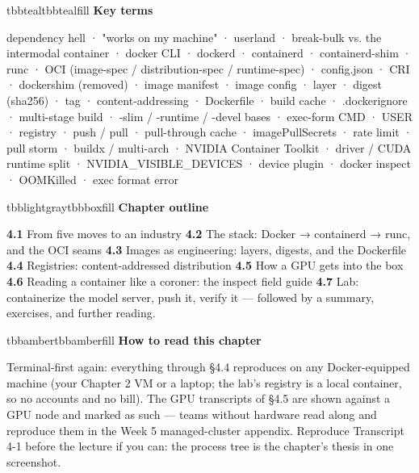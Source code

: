 \vspace{5.0pt}

\begin{calloutbox}{tbbteal}{tbbtealfill}
{\normalsize\bfseries\color{tbbteal}Key terms}\par\vspace{3pt}
dependency hell · "works on my machine" · userland · break-bulk vs. the intermodal container · docker CLI · dockerd · containerd · containerd-shim · runc · OCI (image-spec / distribution-spec / runtime-spec) · config.json · CRI · dockershim (removed) · image manifest · image config · layer · digest (sha256) · tag · content-addressing · Dockerfile · build cache · .dockerignore · multi-stage build · -slim / -runtime / -devel bases · exec-form CMD · USER · registry · push / pull · pull-through cache · imagePullSecrets · rate limit · pull storm · buildx / multi-arch · NVIDIA Container Toolkit · driver / CUDA runtime split · NVIDIA\_VISIBLE\_DEVICES · device plugin · docker inspect · OOMKilled · exec format error
\end{calloutbox}

\vspace{5.0pt}

\begin{calloutbox}{tbblightgray}{tbbboxfill}
{\normalsize\bfseries\color{tbbink}Chapter outline}\par\vspace{3pt}
\textbf{4.1} From five moves to an industry    \textbf{4.2} The stack: Docker → containerd → runc, and the OCI seams    \textbf{4.3} Images as engineering: layers, digests, and the Dockerfile    \textbf{4.4} Registries: content-addressed distribution    \textbf{4.5} How a GPU gets into the box    \textbf{4.6} Reading a container like a coroner: the inspect field guide    \textbf{4.7} Lab: containerize the model server, push it, verify it — followed by a summary, exercises, and further reading.
\end{calloutbox}

\vspace{3.0pt}

\begin{calloutbox}{tbbamber}{tbbamberfill}
{\normalsize\bfseries\color{tbbamberdark}How to read this chapter}\par\vspace{3pt}
Terminal-first again: everything through §4.4 reproduces on any Docker-equipped machine (your Chapter 2 VM or a laptop; the lab's registry is a local  container, so no accounts and no bill). The GPU transcripts of §4.5 are shown against a GPU node and marked as such — teams without hardware read along and reproduce them in the Week 5 managed-cluster appendix. Reproduce Transcript 4-1 before the lecture if you can: the process tree is the chapter's thesis in one screenshot.
\end{calloutbox}

